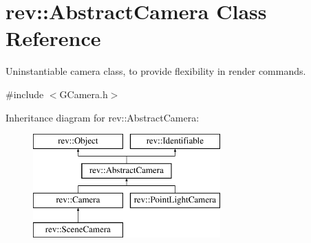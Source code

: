 \hypertarget{classrev_1_1_abstract_camera}{}\section{rev\+::Abstract\+Camera Class Reference}
\label{classrev_1_1_abstract_camera}


Uninstantiable camera class, to provide flexibility in render commands.  




{\ttfamily \#include $<$G\+Camera.\+h$>$}

Inheritance diagram for rev\+::Abstract\+Camera\+:\begin{figure}[H]
\begin{center}
\leavevmode
\includegraphics[height=4.000000cm]{classrev_1_1_abstract_camera}
\end{center}
\end{figure}
